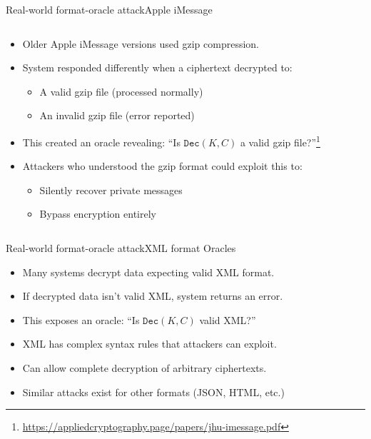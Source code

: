 \documentclass[aspectratio=169, lualatex, handout]{beamer}
\begin{document}
\begin{frame}{Real-world format-oracle attack}{Apple iMessage}
	\begin{columns}[c]
		\begin{column}{1\textwidth}
			\begin{itemize}[<+->]
				\item Older Apple iMessage versions used gzip compression.
				\item System responded differently when a ciphertext decrypted to:
				      \begin{itemize}
					      \item A valid gzip file (processed normally)
					      \item An invalid gzip file (error reported)
				      \end{itemize}
				\item This created an oracle revealing: ``Is $\texttt{Dec}(K, C)$ a valid gzip file?''\footnote{\url{https://appliedcryptography.page/papers/jhu-imessage.pdf}}
				\item Attackers who understood the gzip format could exploit this to:
				      \begin{itemize}
					      \item Silently recover private messages
					      \item Bypass encryption entirely
				      \end{itemize}
			\end{itemize}
		\end{column}
	\end{columns}
\end{frame}

\begin{frame}{Real-world format-oracle attack}{XML format Oracles}
	\begin{itemize}[<+->]
		\item Many systems decrypt data expecting valid XML format.
		\item If decrypted data isn't valid XML, system returns an error.
		\item This exposes an oracle: ``Is $\texttt{Dec}(K, C)$ valid XML?''
		\item XML has complex syntax rules that attackers can exploit.
		\item Can allow complete decryption of arbitrary ciphertexts.
		\item Similar attacks exist for other formats (JSON, HTML, etc.)
	\end{itemize}
\end{frame}
\end{document}
